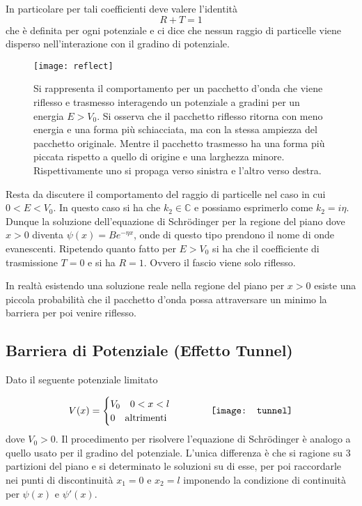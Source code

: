 \noindent In particolare per tali coefficienti deve valere l'identit\`a 
\begin{equation*}
	R + T =1
\end{equation*}
che \`e definita per ogni potenziale e ci dice che nessun raggio di particelle viene disperso nell'interazione con il gradino di potenziale.

 
\begin{figure}[ht]
\vspace{0.1in}
\texttt{[image: reflect]}	
\centering
\vspace{0.1in}
\caption{Si rappresenta il comportamento per un pacchetto d'onda che viene riflesso e trasmesso interagendo un potenziale a gradini per un energia $E > V_0$. Si osserva che il pacchetto riflesso ritorna con meno energia e una forma pi\`u schiacciata, ma con la stessa ampiezza del pacchetto originale. Mentre il pacchetto trasmesso ha una forma pi\`u piccata rispetto a quello di origine e una larghezza minore. Rispettivamente uno si propaga verso sinistra e l'altro verso destra.}
\end{figure}

\newpage

Resta da discutere il comportamento del raggio di particelle nel caso in cui $0< E < V_0$. In questo caso si ha che $k_2 \in \mathbb{C}$ e possiamo esprimerlo come $k_2 = i \eta$. Dunque la soluzione dell'equazione di Schr\"odinger per la regione del piano dove $x > 0$ diventa $\psi(x) = Be^{-\eta x}$, onde di questo tipo prendono il nome di onde evanescenti. Ripetendo quanto fatto per $E > V_0$ si ha che il coefficiente di trasmissione $T = 0$ e si ha $R=1$. Ovvero il fascio viene solo riflesso.
\newline

\noindent In realt\`a esistendo una soluzione reale nella regione del piano per $x > 0$ esiste una piccola probabilit\`a che il pacchetto d'onda possa attraversare un minimo la barriera per poi venire riflesso.

\subsection{Barriera di Potenziale (Effetto Tunnel)}
Dato il seguente potenziale limitato

 \begin{equation*}
 	V(x) = \begin{cases}
 		V_0 \quad 0< x < l \\
 		0 \quad \text{altrimenti} \\
 	\end{cases}	
 	\quad\quad\quad 
 	\vcenter{\hbox{\texttt{[image: tunnel]}}}
 \end{equation*}
 dove $V_0 > 0$. Il procedimento per risolvere l'equazione di Schr\"odinger \`e analogo a quello usato per il gradino del potenziale. L'unica differenza \`e che si ragione su 3 partizioni del piano e si determinato le soluzioni su di esse, per poi raccordarle nei punti di discontinuit\`a $x_1 = 0$ e $x_2 = l$ imponendo la condizione di continuit\`a per $\psi(x)$ e $\psi'(x)$. 
 
